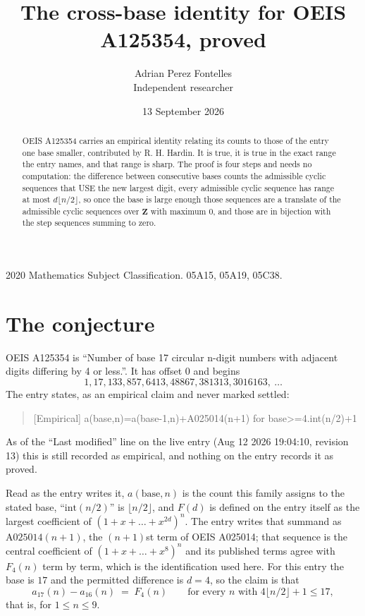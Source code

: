 \documentclass[11pt,a4paper]{article}
\title{The cross-base identity for OEIS A125354, proved}
\author{Adrian Perez Fontelles\\ \small Independent researcher}
\date{13 September 2026}
\theoremstyle{plain}
\theoremstyle{definition}
\begin{document}
\maketitle

\begin{abstract}
OEIS A125354 carries an empirical identity relating its counts to those of the entry one base
smaller, contributed by R. H. Hardin. It is true, it is true in the exact range the entry
names, and that range is sharp. The proof is four steps and needs no computation: the
difference between consecutive bases counts the admissible cyclic sequences that USE the new
largest digit, every admissible cyclic sequence has range at most $d\lfloor n/2\rfloor$, so
once the base is large enough those sequences are a translate of the admissible cyclic
sequences over $\mathbf{Z}$ with maximum $0$, and those are in bijection with the step
sequences summing to zero.
\end{abstract}

\noindent\small 2020 Mathematics Subject Classification. 05A15, 05A19, 05C38.\normalsize

\section{The conjecture}

OEIS A125354 is ``Number of base 17 circular n-digit numbers with adjacent digits differing by 4 or less.''. It has offset $0$ and begins
\[
1, 17, 133, 857, 6413, 48867, 381313, 3016163,\ \dots
\]
The entry states, as an empirical claim and never marked settled:
\begin{quote}
[Empirical] a(base,n)=a(base-1,n)+A025014(n+1) for base>=4.int(n/2)+1
\end{quote}
As of the ``Last modified'' line on the live entry (Aug 12 2026 19:04:10, revision 13)
this is still recorded as empirical, and nothing on the entry records it as proved.

Read as the entry writes it, $a(\mathrm{base},n)$ is the count this family assigns to the
stated base, ``$\mathrm{int}(n/2)$'' is $\lfloor n/2\rfloor$, and $F(d)$ is defined on the
entry itself as the largest coefficient of $(1+x+\dots+x^{2d})^{n}$. The entry writes that summand as $\mathrm{A025014}(n+1)$, the $(n+1)$st term of OEIS A025014; that sequence is the central coefficient of $(1+x+\dots+x^{8})^{n}$ and its published terms agree with $F_{4}(n)$ term by term, which is the identification used here. For this entry
the base is $17$ and the permitted difference is $d=4$, so the claim is that
\[
a_{17}(n)-a_{16}(n)\;=\;F_{4}(n)
\qquad\text{for every } n \text{ with } 4\lfloor n/2\rfloor+1\le17,
\]
that is, for $1\le n\le9$.
\end{document}
